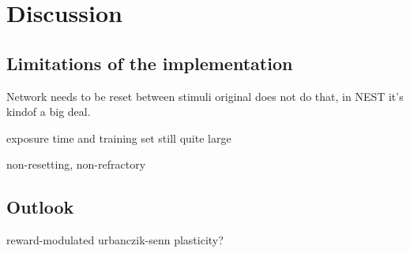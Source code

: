 
\chapter{Discussion}


\section{Limitations of the implementation}

Network needs to be reset between stimuli
original does not do that, in NEST it's kindof a big deal.

exposure time and training set still quite large

non-resetting, non-refractory


\section{Outlook}

reward-modulated urbanczik-senn plasticity?

